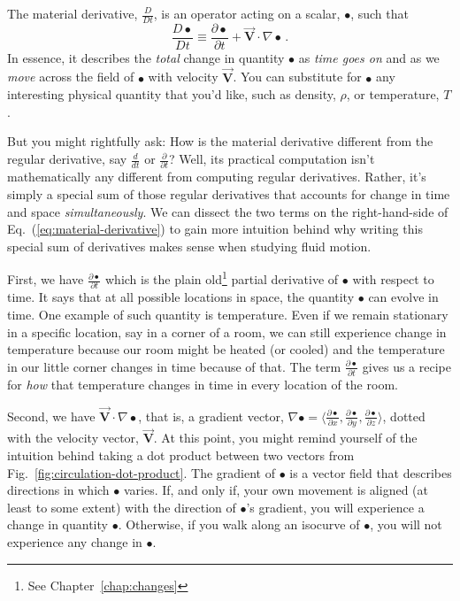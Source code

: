 The material derivative, $\frac{D}{Dt}$, is an operator acting on a scalar, $\bullet$, such that
\begin{equation} \label{eq:material-derivative}
\frac{D \bullet}{D t} \equiv \frac{\partial \bullet}{\partial t} + \vec{\bm{V}} \cdot \nabla \bullet \, .
\end{equation}
In essence, it describes the \textit{total} change in quantity $\bullet$ as \textit{time goes on} and as we \textit{move} across the field of $\bullet$ with velocity $\vec{\bm{V}}$. You can substitute for $\bullet$ any interesting physical quantity that you'd like, such as density, $\rho$, or temperature, $T$.

But you might rightfully ask: How is the material derivative different from the regular derivative, say $\frac{d}{dt}$ or $\frac{\partial}{\partial t}$? Well, its practical computation isn't mathematically any different from computing regular derivatives. Rather, it's simply a special sum of those regular derivatives that accounts for change in time and space \textit{simultaneously}. We can dissect the two terms on the right-hand-side of Eq.~(\ref{eq:material-derivative}) to gain more intuition behind why writing this special sum of derivatives makes sense when studying fluid motion.

First, we have $\frac{\partial \bullet}{\partial t}$ which is the plain old\footnote{See Chapter~\ref{chap:changes}} partial derivative of $\bullet$ with respect to time. It says that at all possible locations in space, the quantity $\bullet$ can evolve in time. One example of such quantity is temperature. Even if we remain stationary in a specific location, say in a corner of a room, we can still experience change in temperature because our room might be heated (or cooled) and the temperature in our little corner changes in time because of that. The term $\frac{\partial \bullet}{\partial t}$ gives us a recipe for \textit{how} that temperature changes in time in every location of the room.

Second, we have $\vec{\bm{V}} \cdot \nabla \bullet$, that is, a gradient vector, $\nabla \bullet = \langle \frac{\partial \bullet}{\partial x}, \frac{\partial \bullet}{\partial y}, \frac{\partial \bullet}{\partial z} \rangle$, dotted with the velocity vector, $\vec{\bm{V}}$. At this point, you might remind yourself of the intuition behind taking a dot product between two vectors from Fig.~\ref{fig:circulation-dot-product}. The gradient of $\bullet$ is a vector field that describes directions in which $\bullet$ varies. If, and only if, your own movement is aligned (at least to some extent) with the direction of $\bullet$'s gradient, you will experience a change in quantity $\bullet$. Otherwise, if you walk along an isocurve of $\bullet$, you will not experience any change in $\bullet$.

